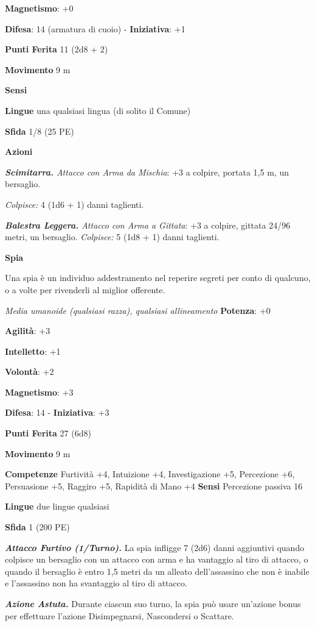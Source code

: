 \begin{multicols}{2}
\textbf{Magnetismo}: +0

\textbf{Difesa}: 14 (armatura di cuoio) - \textbf{Iniziativa}: +1

\textbf{Punti Ferita} 11 (2d8 + 2)

\textbf{Movimento} 9 m

\textbf{Sensi} 

\textbf{Lingue} una qualsiasi lingua (di solito il Comune)

\textbf{Sfida} 1/8 (25 PE)

\textbf{Azioni}

\emph{\textbf{Scimitarra.} Attacco con Arma da Mischia}: +3 a colpire,
portata 1,5 m, un bersaglio.

\emph{Colpisce:} 4 (1d6 + 1) danni taglienti.

\emph{\textbf{Balestra Leggera.} Attacco con Arma a Gittata}: +3 a
colpire, gittata 24/96 metri, un bersaglio. \emph{Colpisce:} 5 (1d8 + 1)
danni taglienti.

\textbf{Spia}

Una spia è un individuo addestramento nel reperire segreti per conto di
qualcuno, o a volte per rivenderli al miglior offerente.

\emph{Media umanoide (qualsiasi razza), qualsiasi allineamento}
\textbf{Potenza}: +0

\textbf{Agilità}: +3

\textbf{Intelletto}: +1

\textbf{Volontà}: +2

\textbf{Magnetismo}: +3

\textbf{Difesa}: 14 - \textbf{Iniziativa}: +3

\textbf{Punti Ferita} 27 (6d8)

\textbf{Movimento} 9 m

\textbf{Competenze} Furtività +4, Intuizione +4, Investigazione +5,
Percezione +6, Persuasione +5, Raggiro +5, Rapidità di Mano +4
\textbf{Sensi} Percezione passiva 16

\textbf{Lingue} due lingue qualsiasi

\textbf{Sfida} 1 (200 PE)

\emph{\textbf{Attacco Furtivo (1/Turno).}} La spia infligge 7 (2d6)
danni aggiuntivi quando colpisce un bersaglio con un attacco con arma e
ha vantaggio al tiro di attacco, o quando il bersaglio è entro 1,5 metri
da un alleato dell'assassino che non è inabile e l'assassino non ha
svantaggio al tiro di attacco.

\emph{\textbf{Azione Astuta.}} Durante ciascun suo turno, la spia può
usare un'azione bonus per effettuare l'azione Disimpegnarsi, Nascondersi
o Scattare.


\end{multicols}
